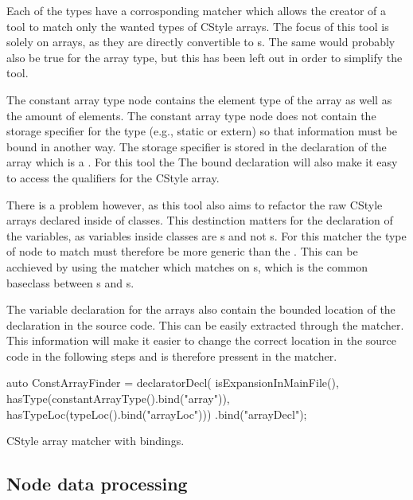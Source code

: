 Each of the types have a corrosponding matcher which allows the creator of a tool to match only the wanted types of CStyle arrays. The focus of this tool is solely on  arrays, as they are directly convertible to s. The same would probably also be true for the  array type, but this has been left out in order to simplify the tool.

The constant array type node contains the element type of the array as well as the amount of elements. The constant array type node does not contain the storage specifier for the type (e.g., static or extern) so that information must be bound in another way. The storage specifier is stored in the declaration of the array which is a . For this tool the  The bound declaration will also make it easy to access the qualifiers for the CStyle array. 

There is a problem however, as this tool also aims to refactor the raw CStyle arrays declared inside of classes. This destinction matters for the declaration of the variables, as variables inside classes are s and not s. For this matcher the type of node to match must therefore be more generic than the . This can be acchieved by using the  matcher which matches on s, which is the common baseclass between s and s.

The variable declaration for the arrays also contain the bounded location of the declaration in the source code. This can be easily extracted through the  matcher. This information will make it easier to change the correct location in the source code in the following steps and is therefore pressent in the matcher.

\begin{listing}[H]
    \begin{cppcode}
auto ConstArrayFinder = 
    declaratorDecl(
        isExpansionInMainFile(),
        hasType(constantArrayType().bind("array")),
        hasTypeLoc(typeLoc().bind("arrayLoc")))
    .bind("arrayDecl");
    \end{cppcode}
    \caption{CStyle array matcher with bindings.}
    \label{code:085tool_ex:CSMatcher}
\end{listing}

\subsection{Node data processing}

